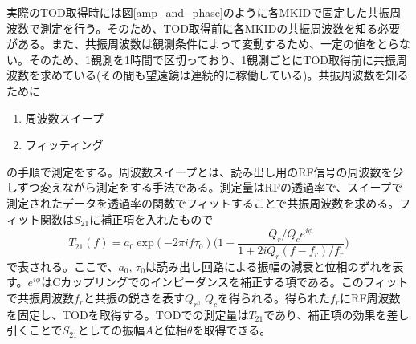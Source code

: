 実際のTOD取得時には図\ref{amp_and_phase}のように各MKIDで固定した共振周波数で測定を行う。そのため、TOD取得前に各MKIDの共振周波数を知る必要がある。また、共振周波数は観測条件によって変動するため、一定の値をとらない。そのため、1観測を1時間で区切っており、1観測ごとにTOD取得前に共振周波数を求めている(その間も望遠鏡は連続的に稼働している)。共振周波数を知るために
\begin{enumerate}
  \item 周波数スイープ
  \item フィッティング
\end{enumerate}
の手順で測定をする。周波数スイープとは、読み出し用のRF信号の周波数を少しずつ変えながら測定をする手法である。測定量はRFの透過率で、スイープで測定されたデータを透過率の関数でフィットすることで共振周波数を求める。フィット関数は$S_{21}$に補正項を入れたもので
\begin{equation}
  T_{21}(f) = a_{0}~\mathrm{exp}(-2\pi if\tau_{0})\biggl(1-\frac{Q_{r}/Q_{c}e^{i\phi}}{1+2iQ_{r}(f-f_{r})/f_{r}}\biggr)
\end{equation}
で表される\cite{sueno_master}。ここで、$a_{0}$, $\tau_{0}$は読み出し回路による振幅の減衰と位相のずれを表す。$e^{i\phi}$はCカップリングでのインピーダンスを補正する項である。このフィットで共振周波数$f_{r}$と共振の鋭さを表す$Q_{r}$, $Q_{c}$を得られる。得られた$f_{r}$にRF周波数を固定し、TODを取得する。TODでの測定量は$T_{21}$であり、補正項の効果を差し引くことで$S_{21}$としての振幅$A$と位相$\theta$を取得できる。
